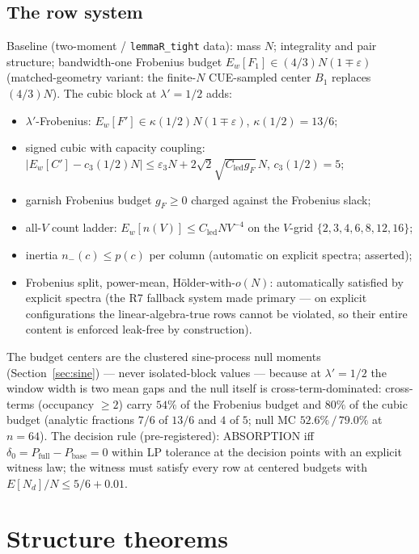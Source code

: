\documentclass[11pt]{article}
\theoremstyle{plain}
\theoremstyle{definition}
\theoremstyle{remark}
\newcommand{\Cled}{C_{\mathrm{led}}}
\newcommand{\Nd}{N_{d}}
\begin{document}
\subsection{The row system}
\label{sec:rowsystem}

Baseline (two-moment / \texttt{lemmaR\_tight} data): mass $N$; integrality and
pair structure; bandwidth-one Frobenius budget
$E_w[F_1] \in (4/3) N (1 \mp \varepsilon)$ (matched-geometry variant: the
finite-$N$ CUE-sampled center $B_1$ replaces $(4/3)N$). The cubic block at
$\lambda' = 1/2$ adds:
\begin{itemize}
\item[(R-5)] $\lambda'$-Frobenius:
  $E_w[F'] \in \kappa(1/2) N (1 \mp \varepsilon)$, $\kappa(1/2) = 13/6$;
\item[(R-6)] signed cubic with capacity coupling:
  $\bigl| E_w[C'] - c_3(1/2) N \bigr|
   \le \varepsilon_3 N + 2\sqrt{2}\sqrt{\Cled g_F}\, N$, $c_3(1/2) = 5$;
\item[(R-5$'$)] garnish Frobenius budget $g_F \ge 0$ charged against the
  Frobenius slack;
\item[(R-7)] all-$V$ count ladder:
  $E_w[n(V)] \le \Cled N V^{-4}$ on the $V$-grid $\{2, 3, 4, 6, 8, 12, 16\}$;
\item[(R-8)] inertia $n_-(c) \le p(c)$ per column (automatic on explicit
  spectra; asserted);
\item[(R-9)] Frobenius split, power-mean, H\"older-with-$o(N)$: automatically
  satisfied by explicit spectra (the R7 fallback system made primary --- on
  explicit configurations the linear-algebra-true rows cannot be violated, so
  their entire content is enforced leak-free by construction).
\end{itemize}

The budget centers are the clustered sine-process null moments
(Section~\ref{sec:sine}) --- never isolated-block values --- because at
$\lambda' = 1/2$ the window width is two mean gaps and the null itself is
cross-term-dominated: cross-terms (occupancy $\ge 2$) carry $54\%$ of the
Frobenius budget and $80\%$ of the cubic budget (analytic fractions $7/6$ of
$13/6$ and $4$ of $5$; null MC $52.6\%\,/\,79.0\%$ at $n = 64$). The decision rule
(pre-registered): ABSORPTION iff
$\delta_0 = P_{\mathrm{full}} - P_{\mathrm{base}} = 0$ within LP tolerance at the
decision points with an explicit witness law; the witness must satisfy every row
at centered budgets with $E[\Nd]/N \le 5/6 + 0.01$.

\section{Structure theorems}
\label{sec:structure}
\end{document}
